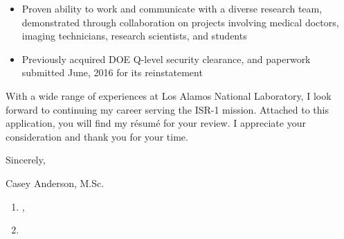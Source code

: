 \begin{center}
\begin{minipage}{\textwidth}
\begin{itemize}[leftmargin=.15in,rightmargin=.25in,itemsep=1.0mm]
	\item Proven ability to work and communicate with a diverse research team, demonstrated through collaboration on projects involving medical doctors, imaging technicians, research scientists, and students
		
	\item Previously acquired DOE Q-level security clearance, and paperwork submitted June, 2016 for its reinstatement
  \end{itemize} 

  \vspace{3mm}
  With a wide range of experiences at Los Alamos National Laboratory, I look forward to continuing my career serving the ISR-1 mission.
  Attached to this application, you will find my r\'{e}sum\'{e} for your review. I appreciate your consideration and thank you for your time.
  
  \vspace{6mm}
  
  Sincerely, \\ \vspace{-4mm}
  
  
  Casey Anderson, M.Sc.
  
  \end{minipage}
\end{center}

\vspace{2mm}


\begin{center}
\begin{minipage}{0.95\textwidth}
	\normalsize
	\begin{enumerate}[leftmargin=5mm,itemsep=1mm]
	\item {}, \label{ieee_nss_paper}
	\item {} \label{mcnp_manual}
   \end{enumerate}
\end{minipage}
\end{center}

